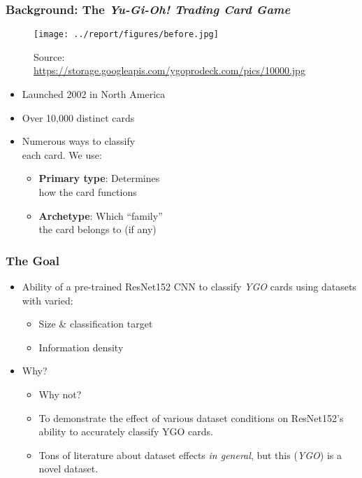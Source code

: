 \documentclass[11pt]{beamer}
\begin{document}
\begin{frame}
	\frametitle{Background: The \textit{Yu-Gi-Oh! Trading Card Game}}

	\begin{figure}
	\vspace*{-2cm}
	\hspace*{6.5cm}
	\texttt{[image: ../report/figures/before.jpg]}
	\caption{Source: \url{https://storage.googleapis.com/ygoprodeck.com/pics/10000.jpg}}
	\end{figure}
	\vspace*{-6cm}
	\begin{itemize}
	\pause
	\item Launched 2002 in North America
	\pause
	\item Over 10,000 distinct cards
	\pause
	\item Numerous ways to classify\\each card. We use:
	\pause
		\begin{itemize}
		\item \textbf{Primary type}: Determines \\how the card functions
	\pause
		\item \textbf{Archetype}: Which ``family''\\the card belongs to (if any)
		\end{itemize}
	\end{itemize}
	
\end{frame}

\begin{frame}
	\frametitle{The Goal}
	\pause
	\begin{itemize}
	\item Ability of a pre-trained ResNet152 CNN to classify \textit{YGO} cards using datasets with varied:
		\pause
		\begin{itemize}
		\item Size \& classification target%
\pause
		\item Information density%
		\end{itemize}
\pause
	\item Why?
		\begin{itemize}
\pause
		\item Why not?
\pause
		\item To demonstrate the effect of various dataset conditions on ResNet152's ability to accurately classify YGO cards.
\pause
		\item Tons of literature about dataset effects \textit{in general}, but this (\textit{YGO}) is a novel dataset.
		\end{itemize}
	\end{itemize}

\end{frame}
\end{document}
